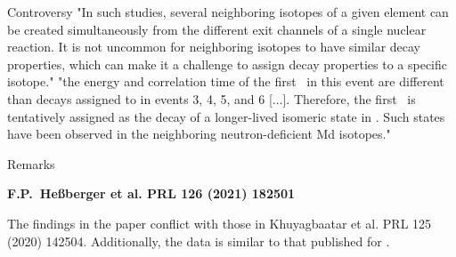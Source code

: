 \documentclass{beamer}
\begin{document}
\begin{frame}{Controversy}
    \vspace{1.2em}
    "In such studies, several neighboring isotopes of a given element can be created simultaneously from the different exit channels of a single nuclear reaction. It is not uncommon for neighboring isotopes to have similar decay properties, which can make it a challenge to assign decay properties to a specific isotope." 
    \vfill
    "the energy and correlation time of the first \textalpha\ in this event are different than decays assigned to  in events 3, 4, 5, and 6 [...]. Therefore, the first \textalpha\ is tentatively assigned as the decay of a longer-lived isomeric state in . Such states have been observed in the neighboring neutron-deficient Md isotopes."
\end{frame}
\begin{frame}{Remarks}
    \begin{center}
        \textbf{F.P.~He\ss berger {et al.} PRL 126 (2021) 182501}
    \end{center}
    The findings in the paper conflict with those in Khuyagbaatar et al. PRL 125 (2020) 142504. Additionally, the data is similar to that published for .


\end{frame}
\end{document}
